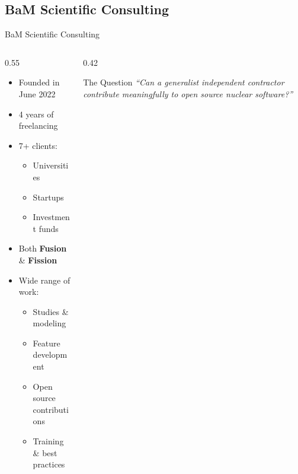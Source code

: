 \subsection{BaM Scientific Consulting}
\begin{frame}{BaM Scientific Consulting}
  \begin{columns}
    \begin{column}{0.55\textwidth}
      \begin{itemize}
        \item Founded in June 2022
        \item 4 years of freelancing
        \item 7+ clients:
          \begin{itemize}
            \item Universities
            \item Startups
            \item Investment funds
          \end{itemize}
        \item Both \textbf{Fusion} \& \textbf{Fission}
        \item Wide range of work:
          \begin{itemize}
            \item Studies \& modeling
            \item Feature development
            \item Open source contributions
            \item Training \& best practices
          \end{itemize}
      \end{itemize}
    \end{column}
    \begin{column}{0.42\textwidth}
      \begin{block}{The Question}
        \centering
        \textit{``Can a generalist independent contractor contribute meaningfully to open source nuclear software?''}
      \end{block}
    \end{column}
  \end{columns}
\end{frame}